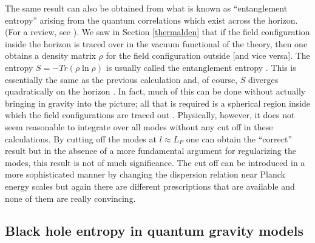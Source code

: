\documentclass[12pt]{iopart}
\begin{document}
   The same result can also be obtained from what is known as
   ``entanglement entropy'' arising from the quantum correlations 
    which exist across the horizon. (For a review, see \cite{shanki}). 
    We saw in Section \ref{thermalden} that if
     the field configuration inside the horizon
    is  traced over in the vacuum functional of the theory, then one obtains a density matrix $\rho$
    for the field configuration outside [and vice versa]. The entropy $ S=-Tr(\rho \ln \rho)$
    is usually called the entanglement entropy
    \cite{Dowker:1994fi,Israel:1976ur,Callan:1994py}. This is essentially the same as the previous 
    calculation and, of course, $S$ diverges quadratically on the horizon
    \cite{Frolov:1993ym,Zurek:1985gd}. In fact, much of this can be done 
    without actually bringing in gravity into the picture; all that is required is a spherical
    region inside which the field configurations are traced out \cite{Bombelli:1986rw,Srednicki:1993im}.  
Physically, however,  it does not seem reasonable to integrate over all modes without any cut off in these calculations.
By cutting off the modes at 
   $l \approx L_P$ one can obtain the ``correct'' result but in the absence of a 
   more fundamental argument for regularizing the modes, this result is not of 
   much significance.  The cut off can be introduced in a more sophisticated manner by changing the dispersion relation near Planck energy scales but again there are different prescriptions that are available 
\cite{Padmanabhan:1998jp,Padmanabhan:1998vr,Unruh:1994zw,Corley:1996ar} and none of them are really convincing. 


 

     
     
\subsection{Black hole entropy in quantum gravity models}\label{qgbh}
\end{document}
